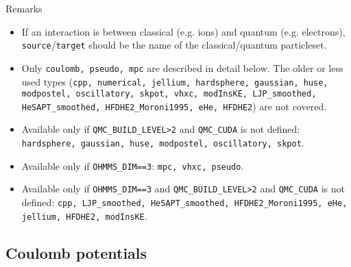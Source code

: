 Remarks
\begin{itemize}
  \item{If an interaction is between classical (e.g. ions) and quantum (e.g. electrons), \texttt{source}/\texttt{target} should be the name of the classical/quantum particleset.}
  \item{Only \texttt{coulomb, pseudo, mpc} are described in detail below.  The older or less used types (\texttt{cpp, numerical, jellium, hardsphere, gaussian, huse, modpostel, oscillatory, skpot, vhxc, modInsKE, LJP\_smoothed, HeSAPT\_smoothed, HFDHE2\_Moroni1995, eHe, HFDHE2}) are not covered.}
  \item{Available only if \texttt{QMC\_BUILD\_LEVEL>2} and \texttt{QMC\_CUDA} is not defined: \texttt{hardsphere, gaussian, huse, modpostel, oscillatory, skpot}.}
  \item{Available only if \texttt{OHMMS\_DIM==3}: \texttt{mpc, vhxc, pseudo}.}
  \item{Available only if \texttt{OHMMS\_DIM==3} and \texttt{QMC\_BUILD\_LEVEL>2} and \texttt{QMC\_CUDA} is not defined: \texttt{cpp, LJP\_smoothed, HeSAPT\_smoothed, HFDHE2\_Moroni1995, eHe, jellium, HFDHE2, modInsKE}.}
\end{itemize}







\subsection{Coulomb potentials}


